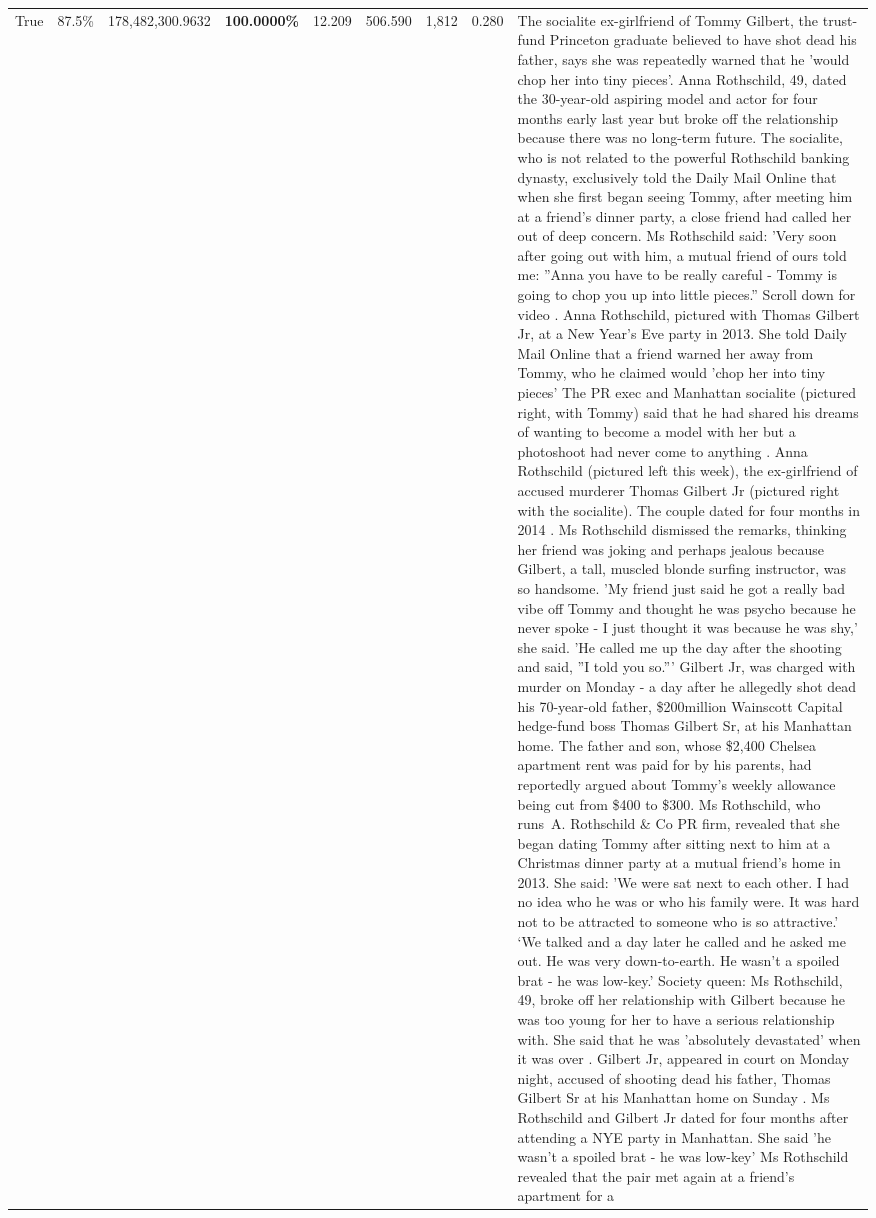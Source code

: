 \begin{table}[H]
\begin{tabular}{lllrlllll}
True & 87.5\% & 178,482,300.9632 & \bfseries \color{red} 100.0000\% & 12.209 & 506.590 & 1,812 & 0.280 & The socialite ex-girlfriend of Tommy Gilbert, the trust-fund Princeton graduate believed to have shot dead his father, says she was repeatedly warned that he 'would chop her into tiny pieces'. Anna Rothschild, 49, dated the 30-year-old aspiring model and actor for four months early last year but broke off the relationship because there was no long-term future. The socialite, who is not related to the powerful Rothschild banking dynasty, exclusively told the Daily Mail Online that when she first began seeing Tommy, after meeting him at a friend's dinner party, a close friend had called her out of deep concern. Ms Rothschild said: 'Very soon after going out with him, a mutual friend of ours told me: ''Anna you have to be really careful - Tommy is going to chop you up into little pieces.'' Scroll down for video . Anna Rothschild, pictured with Thomas Gilbert Jr, at a New Year's Eve party in 2013. She told Daily Mail Online that a friend warned her away from Tommy, who he claimed would 'chop her into tiny pieces' The PR exec and Manhattan socialite (pictured right, with Tommy) said that he had shared his dreams of wanting to become a model with her but a photoshoot had never come to anything . Anna Rothschild (pictured left this week), the ex-girlfriend of accused murderer Thomas Gilbert Jr (pictured right with the socialite). The couple dated for four months in 2014 . Ms Rothschild dismissed the remarks, thinking her friend was joking and perhaps jealous because Gilbert, a tall, muscled blonde surfing instructor, was so handsome. 'My friend just said he got a really bad vibe off Tommy and thought he was psycho because he never spoke - I just thought it was because he was shy,' she said. 'He called me up the day after the shooting and said, ''I told you so.''' Gilbert Jr, was charged with murder on Monday - a day after he allegedly shot dead his 70-year-old father, \$200million Wainscott Capital hedge-fund boss Thomas Gilbert Sr, at his Manhattan home. The father and son, whose \$2,400 Chelsea apartment rent was paid for by his parents, had reportedly argued about Tommy's weekly allowance being cut from \$400 to \$300. Ms Rothschild, who runs A. Rothschild \& Co PR firm, revealed that she began dating Tommy after sitting next to him at a Christmas dinner party at a mutual friend's home in 2013. She said: 'We were sat next to each other. I had no idea who he was or who his family were. It was hard not to be attracted to someone who is so attractive.' ‘We talked and a day later he called and he asked me out. He was very down-to-earth. He wasn’t a spoiled brat - he was low-key.’ Society queen: Ms Rothschild, 49, broke off her relationship with Gilbert because he was too young for her to have a serious relationship with. She said that he was 'absolutely devastated' when it was over . Gilbert Jr, appeared in court on Monday night, accused of shooting dead his father, Thomas Gilbert Sr at his Manhattan home on Sunday . Ms Rothschild and Gilbert Jr dated for four months after attending a NYE party in Manhattan. She said 'he wasn't a spoiled brat - he was low-key' Ms Rothschild revealed that the pair met again at a friend’s apartment for a 
\end{tabular}
\end{table}
